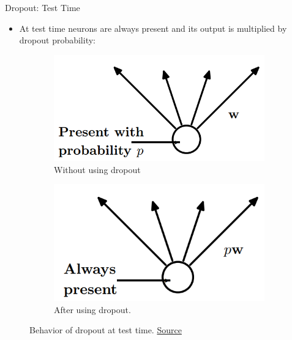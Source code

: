 \begin{frame}{Dropout: Test Time}
\begin{itemize}
	\item At test time neurons are always present and its output is multiplied by dropout probability:
\end{itemize}
\begin{figure}[H]
	\centering
	\begin{subfigure}[b]{0.3\textwidth}
		\centering
		\includegraphics[width=\textwidth]{Images/dropout-test time-before.png}
		\caption{Without using dropout}
		\label{fig:dropout-test time-before}
	\end{subfigure}
	\begin{subfigure}[b]{0.3\textwidth}
		\centering
		\includegraphics[width=\textwidth]{Images/dropout-test time-after.png}
		\caption{After using dropout.}
		\label{fig:dropout-test time-after}
	\end{subfigure}
	\caption{Behavior of dropout at test time. \href{https://www.cs.toronto.edu/~hinton/absps/JMLRdropout.pdf}{Source}}
\end{figure}
\end{frame}


